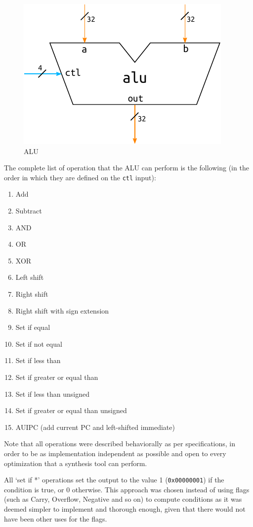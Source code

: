 \documentclass[a4paper]{article}
\begin{document}
\begin{figure}[hbtp]
    \centering
    \includegraphics[]{../alu/ref/schematic/alu.pdf}
    \caption{ALU}
    \label{fig:alu}
\end{figure}

The complete list of operation that the ALU can perform is the following (in the order in which they are defined on the \texttt{ctl} input):
\begin{enumerate}
    \item Add
    \item Subtract
    \item AND 
    \item OR 
    \item XOR 
    \item Left shift
    \item Right shift
    \item Right shift with sign extension
    \item Set if equal
    \item Set if not equal
    \item Set if less than
    \item Set if greater or equal than
    \item Set if less than unsigned
    \item Set if greater or equal than unsigned
    \item AUIPC (add current PC and left-shifted immediate)
\end{enumerate}

Note that all operations were described behaviorally as per specifications, in order to be as implementation independent as possible and open to every optimization that a synthesis tool can perform.

All `set if *' operations set the output to the value 1 (\texttt{0x00000001}) if the condition is true, or 0 otherwise. This approach was chosen instead of using flags (such as Carry, Overflow, Negative and so on) to compute conditions as it was deemed simpler to implement and thorough enough, given that there would not have been other uses for the flags.
\end{document}
